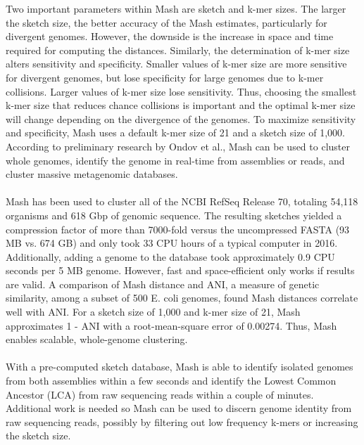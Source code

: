 \documentclass[12pt, letterpaper]{article}
\begin{document}
\FloatBarrier
Two important parameters within Mash are sketch and k-mer sizes. The larger the sketch size, the better accuracy of the Mash estimates, particularly for divergent genomes. However, the downside is the increase in space and time required for computing the distances. Similarly, the determination of k-mer size alters sensitivity and specificity. Smaller values of k-mer size are more sensitive for divergent genomes, but lose specificity for large genomes due to k-mer collisions. Larger values of k-mer size lose sensitivity. Thus, choosing the smallest k-mer size that reduces chance collisions is important and the optimal k-mer size will change depending on the divergence of the genomes. To maximize sensitivity and specificity, Mash uses a default k-mer size of 21 and a sketch size of 1,000. According to preliminary research by Ondov et al., Mash can be used to cluster whole genomes, identify the genome in real-time  from assemblies or reads, and cluster massive metagenomic databases. \\ \\
Mash has been used to cluster all of the NCBI RefSeq Release 70, totaling 54,118 organisms and 618 Gbp of genomic sequence. The resulting sketches yielded a compression factor of more than 7000-fold versus the uncompressed FASTA (93 MB vs. 674 GB) and only took 33 CPU hours of a typical computer in 2016.\cite{MinHash} Additionally, adding a genome to the database took approximately 0.9 CPU seconds per 5 MB genome. However, fast and space-efficient only works if results are valid. A comparison of Mash distance and ANI, a  measure of genetic similarity, among a subset of 500 E. coli genomes, found Mash distances correlate well with ANI. For a sketch size of 1,000 and k-mer size of 21, Mash approximates 1 - ANI with a root-mean-square error of 0.00274. Thus, Mash enables scalable, whole-genome clustering. \\ \\
With a pre-computed sketch database, Mash is able to identify isolated genomes from both assemblies within a few seconds and identify the Lowest Common Ancestor (LCA) from raw sequencing reads within a couple of minutes. Additional work is needed so Mash can be used to discern genome identity from raw sequencing reads, possibly by filtering out low frequency k-mers or increasing the sketch size. \\ \\
\end{document}
